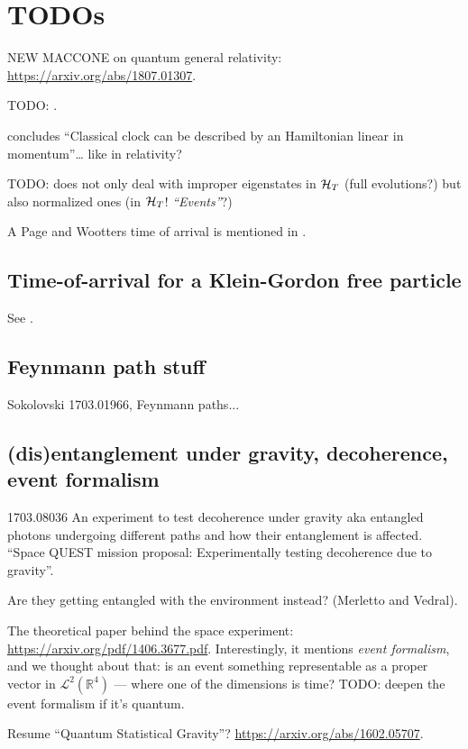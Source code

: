 \section{TODOs}

NEW MACCONE on quantum general relativity: \url{https://arxiv.org/abs/1807.01307}.

TODO: \cite{RealisticClocks}.

\cite{HarmonicClocks} concludes ``Classical clock can be described by an Hamiltonian linear in momentum''\dots
like in relativity?

TODO: \cite{Lloyd:Time} does not only deal with improper eigenstates in $\mathcal{H}_T$
(full evolutions?)
but also normalized ones (in $\mathcal{H}_T$! \emph{``Events''}?)

A Page and Wootters time of arrival is mentioned in \cite{Gambini_PW}.

\subsection{Time-of-arrival for a Klein-Gordon free particle}

See \cite{Galapon_KG}.

\subsection{Feynmann path stuff}

Sokolovski 1703.01966, Feynmann paths...\subsection{(dis)entanglement under gravity, decoherence, event formalism}

1703.08036 An experiment to test decoherence under gravity aka entangled photons undergoing different paths and how their entanglement is affected.
``Space QUEST mission proposal: Experimentally testing decoherence due to gravity''.

Are they getting entangled with the environment instead? (Merletto and Vedral).

The theoretical paper behind the space experiment: \url{https://arxiv.org/pdf/1406.3677.pdf}. Interestingly, it mentions 
\emph{event formalism}, and we thought about that: is an event something
representable as a proper vector in $\mathcal{L}^2(\mathbb{R}^4)$ --- where one of the dimensions is time?
TODO: deepen the event formalism if it's quantum.

Resume ``Quantum Statistical Gravity''? \url{https://arxiv.org/abs/1602.05707}.

